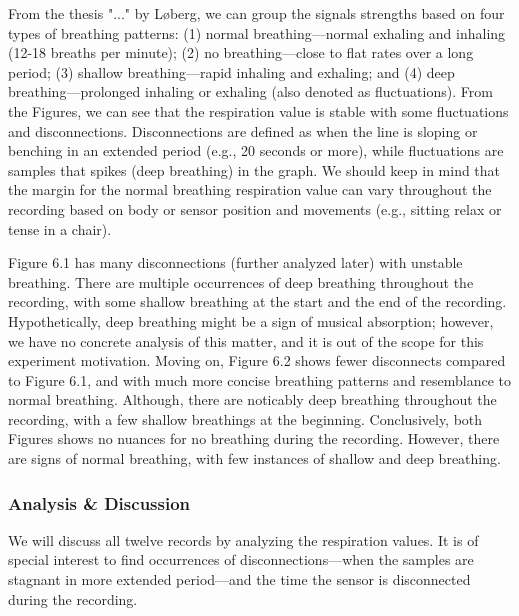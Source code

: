From the thesis "..." by Løberg, we can group the signals strengths based on four types of breathing patterns: (1) normal breathing---normal exhaling and inhaling (12-18 breaths per minute); (2) no breathing---close to flat rates over a long period; (3) shallow breathing---rapid inhaling and exhaling; and (4) deep breathing---prolonged inhaling or exhaling (also denoted as fluctuations). From the Figures, we can see that the respiration value is stable with some fluctuations and disconnections. Disconnections are defined as when the line is sloping or benching in an extended period (e.g., 20 seconds or more), while fluctuations are samples that spikes (deep breathing) in the graph. We should keep in mind that the margin for the normal breathing respiration value can vary throughout the recording based on body or sensor position and movements (e.g., sitting relax or tense in a chair). 

Figure 6.1 has many disconnections (further analyzed later) with unstable breathing. There are multiple occurrences of deep breathing throughout the recording, with some shallow breathing at the start and the end of the recording. Hypothetically, deep breathing might be a sign of musical absorption; however, we have no concrete analysis of this matter, and it is out of the scope for this experiment motivation. Moving on, Figure 6.2 shows fewer disconnects compared to Figure 6.1, and with much more concise breathing patterns and resemblance to normal breathing. Although, there are noticably deep breathing throughout the recording, with a few shallow breathings at the beginning. Conclusively, both Figures shows no nuances for no breathing during the recording. However, there are signs of normal breathing, with few instances of shallow and deep breathing. 

\subsubsection{Analysis \& Discussion}
We will discuss all twelve records by analyzing the respiration values. It is of special interest to find occurrences of disconnections---when the samples are stagnant in more extended period---and the time the sensor is disconnected during the recording.

